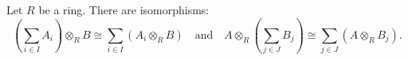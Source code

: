 Let $R$ be a ring. There are isomorphisms:
\[
\left(\sum_{i \in I} A_i\right) \otimes_R B \cong \sum_{i \in I} (A_i \otimes_R B) \quad \text{and} \quad A \otimes_R \left(\sum_{j \in J} B_j\right) \cong \sum_{j \in J} (A \otimes_R B_j).
\]